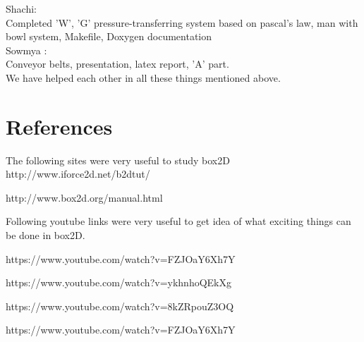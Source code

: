 \documentclass{report}
\begin{document}
Shachi:\\
Completed 'W', 'G' pressure-transferring system based on pascal's law, man with bowl system, Makefile, Doxygen documentation\\

Sowmya : \\
Conveyor belts, presentation, latex report, 'A' part.\\

We have helped each other in all these things mentioned above.\\
\newpage
\section{References}
The following sites were very useful to study box2D
http://www.iforce2d.net/b2dtut/

http://www.box2d.org/manual.html

Following youtube links were very useful to get idea of what exciting things can be done in box2D.

https://www.youtube.com/watch?v=FZJOaY6Xh7Y

https://www.youtube.com/watch?v=ykhnhoQEkXg

https://www.youtube.com/watch?v=8kZRpouZ3OQ

https://www.youtube.com/watch?v=FZJOaY6Xh7Y
\end{document}
